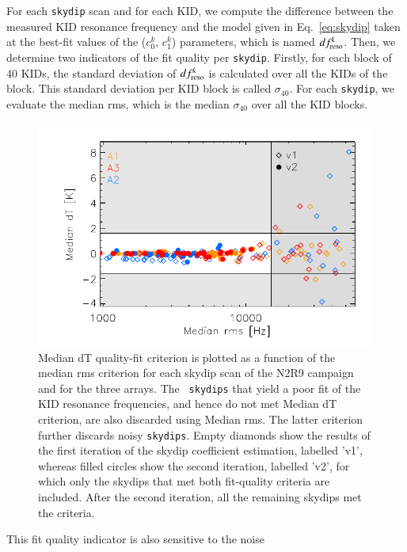 \documentclass[traditionalabstract]{aa}
\newcommand{\lp}[1]{#1}
\begin{document}
{For each {\tt skydip} scan and %
for each KID, 
we compute the difference between the measured KID resonance frequency and the model
given in Eq.~\ref{eq:skydip} taken at the best-fit values of the
($c_0^k$, $c_1^k$) parameters{\lp, which is named $df_{\rm{reso}}^k$.} Then, we
determine two indicators of the fit quality per {\tt skydip}. {\lp Firstly,
for each block of 40 KIDs, the standard deviation of $df_{\rm{reso}}^k$ is calculated
over all the KIDs of the block. This standard deviation per KID block
is called $\sigma_{40}$. For each {\tt skydip}, we evaluate the
median rms, which is the median $\sigma_{40}$ over all the KID blocks.} 
%
\begin{figure}[!htbp]
\begin{center}
\includegraphics[clip=true,width=\linewidth]{Figures/plot_skydip_selection_two_crit.pdf}
\caption[N2R9 skydip scan selection.]{ Median dT quality-fit criterion
is plotted as a function of the median rms criterion for each skydip
scan of the N2R9 campaign and for the three arrays. {\lp The {\tt
skydips} that yield a poor fit of the KID resonance frequencies, and hence
do not met Median dT criterion, are also discarded using
Median rms. The latter criterion further discards noisy {\tt skydips}.}
Empty diamonds show the results of the first
iteration of the skydip coefficient estimation, labelled 'v1', whereas
filled circles show the second iteration, labelled 'v2', for which only the skydips
that met both fit-quality criteria are included.
After the second iteration, all the remaining skydips met the criteria.}
\label{fig:skydipselection}
\end{center}
\end{figure}
%
This fit quality indicator is also sensitive to the noise
}
\end{document}

